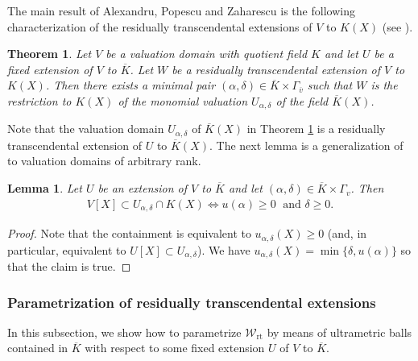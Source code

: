 \documentclass[10pt]{article}
\numberwithin{equation}{section}
\newtheorem{Thm}[equation]{Theorem}
\newtheorem{Lem}[equation]{Lemma}
\theoremstyle{definition}
\theoremstyle{definition}
\newcommand{\rt}{\text{rt}}
\newcommand\rc { \color{red}}
\newcommand\bc { \color{blue}}
\begin{document}
The main result of Alexandru, Popescu and Zaharescu is the following characterization of the  residually transcendental extensions of $V$ to $K(X)$ (see \cite{AlePop,APZTheorem,APZAll}).

\begin{Thm}\label{description rt Popescu}
Let $V$ be a valuation domain with quotient field $K$ and let $U$ be a fixed extension of $V$ to $\overline{K}$. 
Let $W$ be a residually transcendental extension of $V$ to $K(X)$. Then there exists a minimal pair
$(\alpha,\delta)\in\overline K\times\Gamma_{\overline{v}}$ such that $W$ is the restriction to $K(X)$
of the monomial valuation $U_{\alpha,\delta}$ of the field $\overline{K}(X)$.
\end{Thm}


Note that the valuation domain $U_{\alpha,\delta}$ of $\overline K(X)$ in Theorem \ref{description rt Popescu} is a residually transcendental extension of $U$ to $\overline{K}(X)$.
The next lemma is a generalization of \cite[Lemma 3.13]{PerPrufer} to valuation domains of arbitrary rank.

\begin{Lem}\label{rt overring of V[X]}
Let $U$ be an extension of $V$ to $\overline{K}$ and let $(\alpha,\delta)\in\overline{K}\times\Gamma_v$. Then
\begin{align*}
V[X]\subset U_{\alpha,\delta}\cap K(X) 
\Leftrightarrow u(\alpha)\geq0\;\text{ and }\delta\geq0.
\end{align*}
\end{Lem}
\begin{proof}
Note that the containment is equivalent to $u_{\alpha,\delta}(X)\geq0$ (and, in particular, equivalent to $U[X]\subset U_{\alpha,\delta}$). We have $u_{\alpha,\delta}(X)=\min\{\delta,u(\alpha)\}$ so that the claim is true.
\end{proof}


\subsubsection{Parametrization of residually transcendental extensions}\label{section parametrization}

In this subsection, we show how to parametrize $\mathcal W_{\rt}$ by means of ultrametric balls contained in $\overline{K}$ 
with respect to some fixed extension $U$ of $V$ to $\overline{K}$. 
\end{document}
